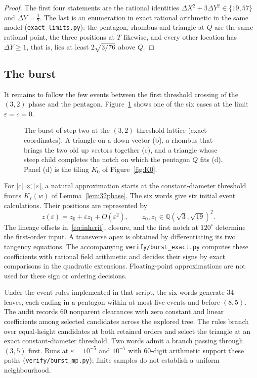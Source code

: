 \documentclass[11pt]{amsart}
\theoremstyle{definition}
\newcommand{\eps}{\varepsilon}
\begin{document}
\begin{proof}
The first four statements are the rational identities $\Delta X^2+3\Delta Y^2\in\{19,57\}$ and $\Delta Y=\tfrac12$.
The last is an enumeration in exact rational arithmetic in the same model (\texttt{exact\_limits.py}): the
pentagon, rhombus and triangle at $Q$ are the same rational point, the three positions at $T$ likewise, and
every other location has $\Delta Y\ge1$, that is, lies at least $2\sqrt{3/76}$ above $Q$.
\end{proof}

\subsection{The burst}\label{sec:burst}
It remains to follow the few events between the first threshold crossing of the $(3,2)$ phase and the
pentagon. Figure~\ref{fig:burst} shows one of the six cases at the limit $\eps=c=0$.

\begin{figure}[t]
\centering
\begin{tikzpicture}[x=1.0cm,y=1.0cm]

\end{tikzpicture}
\caption{The burst of step two at the $(3,2)$ threshold lattice (exact coordinates). A triangle on a down
vector (b), a rhombus that brings the two old up vectors together (c), and a triangle whose steep child
completes the notch on which the pentagon $Q$ fits (d). Panel (d) is the tiling $K_0$ of
Figure~\ref{fig:K0}.}\label{fig:burst}
\end{figure}
For $|c|\ll|\eps|$, a natural approximation starts at the constant-diameter threshold fronts
$K_\eps(w)$ of Lemma~\ref{lem:32phase}. The six words give six initial event calculations.
Their positions are represented by
\[
z(\eps)=z_0+\eps z_1+O(\eps^2),\qquad
z_0,z_1\in\mathbb Q(\sqrt3,\sqrt{19})^2.
\]
The lineage offsets in~\eqref{eq:inherit}, closure, and the first notch at $120^\circ$ determine
the first-order input. A transverse apex is obtained by differentiating its two tangency
equations. The accompanying \texttt{verify/burst\_exact.py} computes these coefficients with
rational field arithmetic and decides their signs by exact comparisons in the quadratic
extensions. Floating-point approximations are not used for these sign or ordering decisions.

Under the event rules implemented in that script, the six words generate $34$ leaves, each
ending in a pentagon within at most five events and before $(8,5)$. The audit records $60$ nonparent clearances with zero constant and linear coefficients
among selected candidates across the explored tree. The rules branch over
equal-height candidates at both retained orders and select the triangle at an exact
constant-diameter threshold. Two words admit a branch passing through $(3,5)$ first.
Runs at $\eps=10^{-5}$ and $10^{-7}$ with $60$-digit arithmetic support these paths
(\texttt{verify/burst\_mp.py}); finite samples do not establish a uniform neighbourhood.
\end{document}
